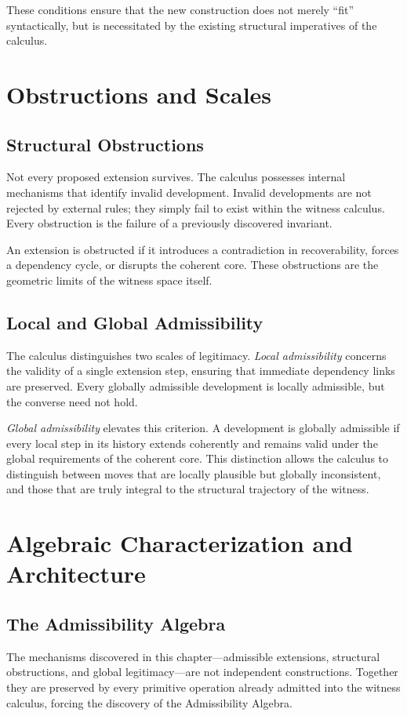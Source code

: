 \documentclass[12pt,anyside]{book}
\begin{document}
These conditions ensure that the new construction does not merely ``fit'' syntactically, but is necessitated by the existing structural imperatives of the calculus.

\section{Obstructions and Scales}

\subsection{Structural Obstructions}
Not every proposed extension survives. The calculus possesses internal mechanisms that identify invalid development. Invalid developments are not rejected by external rules; they simply fail to exist within the witness calculus. Every obstruction is the failure of a previously discovered invariant.

An extension is obstructed if it introduces a contradiction in recoverability, forces a dependency cycle, or disrupts the coherent core. These obstructions are the geometric limits of the witness space itself.

\subsection{Local and Global Admissibility}
The calculus distinguishes two scales of legitimacy. \textit{Local admissibility} concerns the validity of a single extension step, ensuring that immediate dependency links are preserved. Every globally admissible development is locally admissible, but the converse need not hold.

\textit{Global admissibility} elevates this criterion. A development is globally admissible if every local step in its history extends coherently and remains valid under the global requirements of the coherent core. This distinction allows the calculus to distinguish between moves that are locally plausible but globally inconsistent, and those that are truly integral to the structural trajectory of the witness.

\section{Algebraic Characterization and Architecture}

\subsection{The Admissibility Algebra}
The mechanisms discovered in this chapter---admissible extensions, structural obstructions, and global legitimacy---are not independent constructions. Together they are preserved by every primitive operation already admitted into the witness calculus, forcing the discovery of the Admissibility Algebra.
\end{document}
